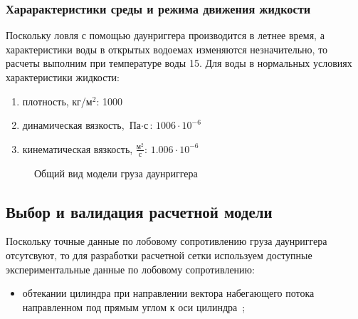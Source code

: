 \documentclass[russian,utf8, pointsubsection]{eskdtext}
\begin{document}
\subsubsection{Харарактеристики среды и режима движения жидкости}
Поскольку ловля с помощью даунриггера производится в летнее время, а характеристики воды в открытых водоемах изменяются незначительно, то расчеты выполним при температуре воды 15\cels. 
Для воды в нормальных условиях характеристики жидкости:
\begin{enumerate}
\item плотность, кг/м$^2$: 1000
\item динамическая вязкость, $\text{Па}\cdot\text{с}$\cite{waterProps}: $1006\cdot10^{-6}$ 
\item кинематическая вязкость, $\frac{\text{м}^2}{\text{с}}$\cite{waterProps}: $1.006\cdot10^{-6}$
\end{enumerate}

\begin{figure}[h]
\caption{Общий вид модели груза даунриггера}
\label{ris:allView}
\end{figure}



\subsection{Выбор и валидация расчетной модели}

Поскольку точные данные по лобовому сопротивлению груза даунриггера отсутсвуют, то для разработки расчетной сетки используем доступные экспериментальные данные по лобовому сопротивлению:
\begin{itemize}
\item обтекании цилиндра при направлении вектора набегающего потока направленном под прямым углом к оси цилиндра~\cite{cylInFlow};
\end{itemize}
\end{document}
